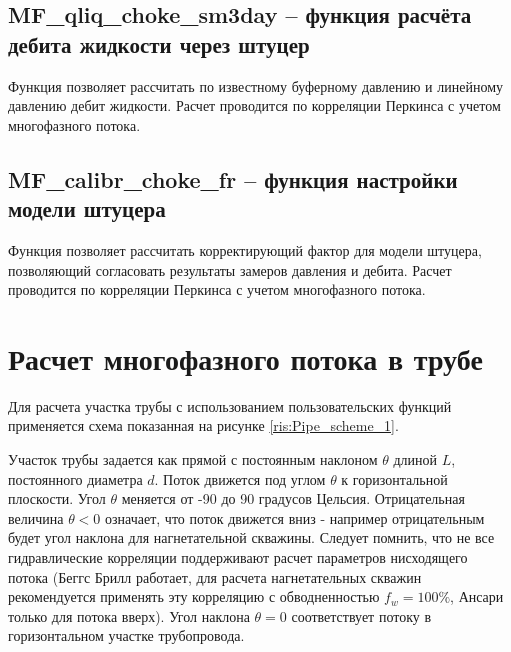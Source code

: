 

\subsection{MF\_qliq\_choke\_sm3day – функция расчёта дебита жидкости через штуцер}
Функция позволяет рассчитать по известному буферному давлению и линейному давлению дебит жидкости. Расчет проводится по корреляции Перкинса \cite{Perkins_1993} с учетом многофазного потока.  



\subsection{MF\_calibr\_choke\_fr – функция настройки модели штуцера}
Функция позволяет рассчитать корректирующий фактор для модели штуцера, позволяющий согласовать результаты замеров давления и дебита. Расчет проводится по корреляции Перкинса \cite{Perkins_1993} с учетом многофазного потока.  


\newpage
\section{Расчет многофазного потока в трубе}

Для расчета участка трубы с использованием пользовательских функций \unf{} применяется схема показанная на рисунке \ref{ris:Pipe_scheme_1}.

Участок трубы задается как прямой с постоянным наклоном $\theta$  длиной $L$, постоянного диаметра $d$. Поток движется под углом $\theta$ к горизонтальной плоскости. Угол  $\theta$ меняется от -90 до 90 градусов Цельсия. Отрицательная величина  $\theta < 0 $ означает, что поток движется вниз - например отрицательным будет угол наклона для нагнетательной скважины. Следует помнить, что не все гидравлические корреляции поддерживают расчет параметров нисходящего потока (Беггс Брилл работает, для расчета нагнетательных скважин рекомендуется применять эту корреляцию с обводненностью $f_w = 100\% $, Ансари только для потока вверх). Угол наклона $\theta = 0 $ соответствует потоку в горизонтальном участке трубопровода.

